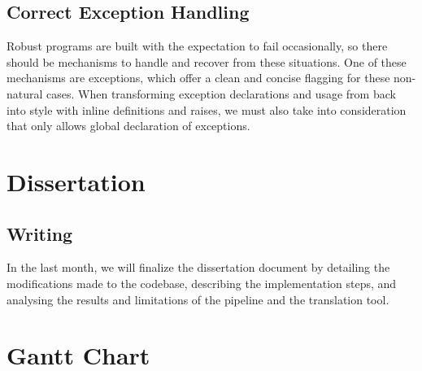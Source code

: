 \subsection{Correct Exception Handling}

Robust programs are built with the expectation to fail occasionally, so there should be mechanisms to handle and recover from these 
situations. One of these mechanisms are exceptions, which offer a clean and concise flagging for these non-natural cases.
When transforming exception declarations and usage from \cml back into \ocaml style with inline definitions and raises, we must also take
into consideration that \cml only allows global declaration of exceptions.

\section{Dissertation}

\subsection{Writing}

In the last month, we will finalize the dissertation document by detailing the modifications made to the codebase, describing the 
implementation steps, and analysing the results and limitations of the pipeline and the translation tool.

\newpage

\section{Gantt Chart}

